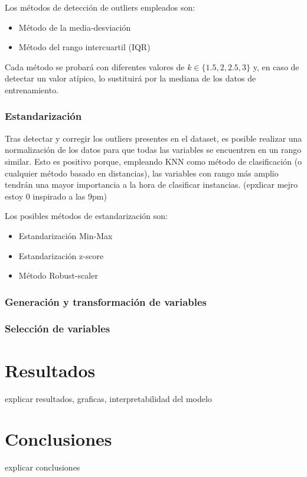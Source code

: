 \documentclass{article}
\begin{document}
Los métodos de detección de outliers empleados son:

\begin{itemize}
    \item Método de la media-desviación
    \item Método del rango intercuartil (IQR)
\end{itemize}

Cada método se probará con diferentes valores de $k \in \{1.5, 2, 2.5, 3\}$ y, en caso de detectar un valor atípico, lo sustituirá por la mediana de los datos de entrenamiento.

\subsubsection{Estandarización}

Tras detectar y corregir los outliers presentes en el dataset, es posible realizar una normalización de los datos para
que todas las variables se encuentren en un rango similar. Esto es positivo porque, empleando KNN como método de clasificación (o cualquier método basado en distancias), las variables con rango más amplio tendrán una mayor importancia
a la hora de clasificar instancias. (epxlicar mejro estoy 0 inspirado a las 9pm)\newline

Los posibles métodos de estandarización son:

\begin{itemize}
    \item Estandarización Min-Max
    \item Estandarización z-score
    \item Método Robust-scaler
\end{itemize}

\subsubsection{Generación y transformación de variables}

\subsubsection{Selección de variables}

\section{Resultados}

explicar resultados, graficas, interpretabilidad del modelo


\section{Conclusiones}

explicar conclusiones
\end{document}
